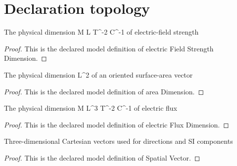 \section{Declaration topology}
\begin{definition}
  \label{def:physics:phyx-mini-0851:phyxminiproblems-problemphyxmini0851-electricfieldstrengthdimension}
  The physical dimension M L T\textasciicircum{}-2 C\textasciicircum{}-1 of electric-field strength
\end{definition}
\begin{proof}
  This is the declared model definition of electric Field Strength Dimension.
\end{proof}
\begin{definition}
  \label{def:physics:phyx-mini-0851:phyxminiproblems-problemphyxmini0851-areadimension}
  The physical dimension L\textasciicircum{}2 of an oriented surface-area vector
\end{definition}
\begin{proof}
  This is the declared model definition of area Dimension.
\end{proof}
\begin{definition}
  \label{def:physics:phyx-mini-0851:phyxminiproblems-problemphyxmini0851-electricfluxdimension}
  The physical dimension M L\textasciicircum{}3 T\textasciicircum{}-2 C\textasciicircum{}-1 of electric flux
\end{definition}
\begin{proof}
  This is the declared model definition of electric Flux Dimension.
\end{proof}
\begin{definition}
  \label{def:physics:phyx-mini-0851:phyxminiproblems-problemphyxmini0851-spatialvector}
  Three-dimensional Cartesian vectors used for directions and SI components
\end{definition}
\begin{proof}
  This is the declared model definition of Spatial Vector.
\end{proof}
